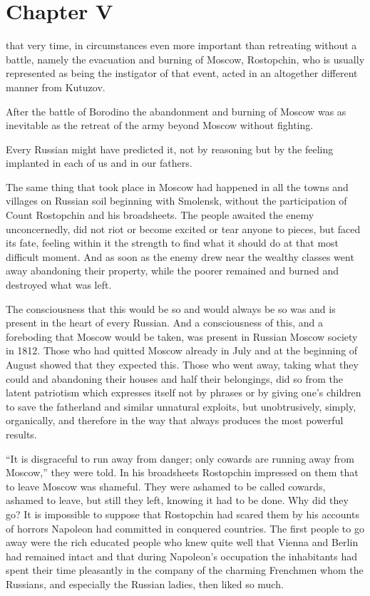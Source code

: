 \chapter*{Chapter V} \ifaudio {}
\fi

 that very time, in circumstances even more important than
retreating without a battle, namely the evacuation and burning of
Moscow, Rostopchin, who is usually represented as being the
instigator of that event, acted in an altogether different manner
from Kutuzov.

After the battle of Borodino the abandonment and burning of
Moscow was as inevitable as the retreat of the army beyond Moscow
without fighting.

Every Russian might have predicted it, not by reasoning but by
the feeling implanted in each of us and in our fathers.

The same thing that took place in Moscow had happened in all the
towns and villages on Russian soil beginning with Smolensk,
without the participation of Count Rostopchin and his
broadsheets. The people awaited the enemy unconcernedly, did not
riot or become excited or tear anyone to pieces, but faced its
fate, feeling within it the strength to find what it should do at
that most difficult moment. And as soon as the enemy drew near
the wealthy classes went away abandoning their property, while
the poorer remained and burned and destroyed what was left.

The consciousness that this would be so and would always be so
was and is present in the heart of every Russian. And a
consciousness of this, and a foreboding that Moscow would be
taken, was present in Russian Moscow society in 1812. Those who
had quitted Moscow already in July and at the beginning of August
showed that they expected this. Those who went away, taking what
they could and abandoning their houses and half their belongings,
did so from the latent patriotism which expresses itself not by
phrases or by giving one's children to save the fatherland and
similar unnatural exploits, but unobtrusively, simply,
organically, and therefore in the way that always produces the
most powerful results.

``It is disgraceful to run away from danger; only cowards are
running away from Moscow,'' they were told. In his broadsheets
Rostopchin impressed on them that to leave Moscow was
shameful. They were ashamed to be called cowards, ashamed to
leave, but still they left, knowing it had to be done. Why did
they go? It is impossible to suppose that Rostopchin had scared
them by his accounts of horrors Napoleon had committed in
conquered countries. The first people to go away were the rich
educated people who knew quite well that Vienna and Berlin had
remained intact and that during Napoleon's occupation the
inhabitants had spent their time pleasantly in the company of the
charming Frenchmen whom the Russians, and especially the Russian
ladies, then liked so much.

